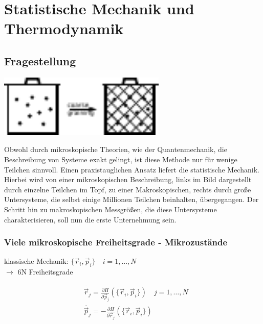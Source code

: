 \chapter{Statistische Mechanik und Thermodynamik}

    \section{Fragestellung}

\begin{center}
    \includegraphics[width=0.6\textwidth]{Abb/1_1.pdf}
\end{center}
Obwohl durch mikroskopische Theorien, wie der Quantenmechanik, die Beschreibung
von Systeme exakt gelingt, ist diese Methode nur für wenige Teilchen sinnvoll.
Einen praxistauglichen Ansatz liefert die statistische Mechanik. Hierbei wird
von einer mikroskopischen Beschreibung, links im Bild dargestellt durch einzelne
Teilchen im Topf, zu einer Makroskopischen, rechts durch große Untersysteme, die
selbst einige Millionen Teilchen beinhalten, übergegangen. Der Schritt hin zu
makroskopischen Messgrößen, die diese Untersysteme charakterisieren, soll nun
die erste Unternehmung sein.

    \subsection{Viele mikroskopische Freiheitsgrade - Mikrozustände}

klassische Mechanik: $\{\vec{r}_i, \vec{p}_i\} \quad i = 1, \dots , N$\\
$\rightarrow$ 6N Freiheitsgrade

\begin{align*}
    &\dot{\vec{r}_j} = \frac{\partial H}{\partial \vec{p}_j} \left( \{
                      \vec{r}_i, \vec{p}_i \} \right) \quad j = 1, \dots, N\\
    &\dot{\vec{p}_j} = - \frac{\partial H}{\partial \vec{r}_j} \left( \{
                         \vec{r}_i, \vec{p}_i\}\right)
\end{align*}
